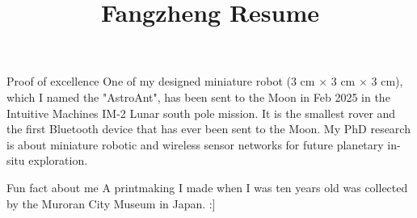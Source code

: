 \documentclass{resume} %
\begin{document}
\title{Fangzheng Resume}

\begin{rSection}{Proof of excellence}
      One of my designed miniature robot (3 cm $\times$ 3 cm $\times$ 3 cm), which I named the "AstroAnt",
      has been sent to the Moon in Feb 2025 in the Intuitive Machines IM-2 Lunar south pole mission.
      It is the smallest rover and the first Bluetooth device that has ever been sent to the Moon.
      My PhD research is about miniature robotic and wireless sensor networks for future planetary in-situ exploration.
\end{rSection}

\begin{rSection}{Fun fact about me}
      A printmaking I made when I was ten years old was collected by the Muroran City Museum in Japan. :]
\end{rSection}
\end{document}
